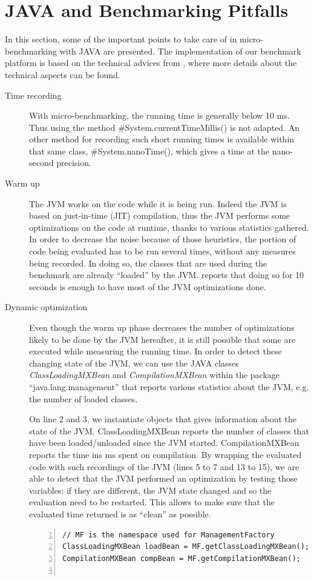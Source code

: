 \section{JAVA and Benchmarking Pitfalls}

In this section, some of the important points to take care of in
micro-benchmarking with JAVA are presented. The implementation of our benchmark
platform is based on the technical advices from \cite{boyer:2008:bench}, where
more details about the technical aspects can be found.

\begin{description}
\item[Time recording] With micro-benchmarking, the running time is generally
below 10 ms. Thus using the method \#System.currentTimeMillis() is not adapted.
An other method for recording such short running times is available within that
same class, \#System.nanoTime(), which gives a time at the nano-second precision.
\item[Warm up] The JVM works on the code while it is being run. Indeed the JVM
is based on just-in-time (JIT) compilation, thus the JVM performs some
optimizations on the code at runtime, thanks to various statistics gathered. In
order to decrease the noise because of those heuristics, the portion of code
being evaluated has to be run several times, without any measures being
recorded. In doing so, the classes that are used during the benchmark are
already ``loaded'' by the JVM. \cite{boyer:2008:bench} reports that doing so for
10 seconds is enough to have most of the JVM optimizations done.
\item[Dynamic optimization] Even though the warm up phase decreases the number
of optimizations likely to be done by the JVM hereafter, it is still possible
that some are executed while measuring the running time. In order to detect
these changing state of the JVM, we can use the JAVA classes
\emph{ClassLoadingMXBean} and \emph{CompilationMXBean} within the package
``java.lang.management'' that reports various statistics about the JVM, e.g. the
number of loaded classes.

On line 2 and 3, we instantiate objects that gives information about the state
of the JVM. ClassLoadingMXBean reports the number of classes that have been
loaded/unloaded since the JVM started. CompilationMXBean reports the time
ins ms spent on compilation. By wrapping the evaluated code with such
recordings of the JVM (lines 5 to 7 and 13 to 15), we are able to detect that
the JVM performed an optimization by testing those variables: if they are
different, the JVM state changed and so the evaluation need to be restarted.
This allows to make sure that the evaluated time returned is as ``clean'' as
possible.
\begin{lstlisting}[frame=single,numbers=left]
// MF is the namespace used for ManagementFactory
ClassLoadingMXBean loadBean = MF.getClassLoadingMXBean();
CompilationMXBean compBean = MF.getCompilationMXBean();


\end{lstlisting}
\end{description}
